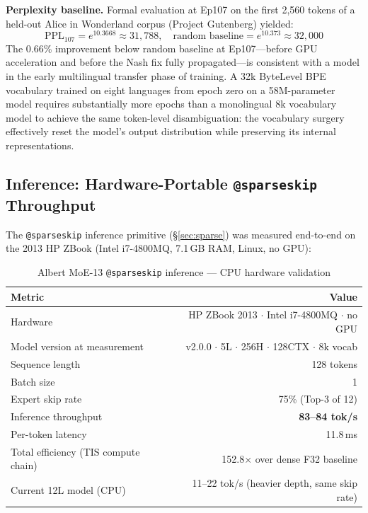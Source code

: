 \documentclass[11pt,a4paper]{article}
\begin{document}
\textbf{Perplexity baseline.}
Formal evaluation at Ep107 on the first 2,560 tokens of a held-out Alice in
Wonderland corpus (Project Gutenberg) yielded:
\begin{equation}
  \text{PPL}_{107} = e^{10.3668} \approx 31{,}788,
  \quad \text{random baseline} = e^{10.373} \approx 32{,}000
\end{equation}
The 0.66\% improvement below random baseline at Ep107---before GPU acceleration
and before the Nash fix fully propagated---is consistent with a model in the early
multilingual transfer phase of training. A 32k ByteLevel BPE vocabulary trained on
eight languages from epoch zero on a 58M-parameter model requires substantially
more epochs than a monolingual 8k vocabulary model to achieve the same
token-level disambiguation: the vocabulary surgery effectively reset the model's
output distribution while preserving its internal representations.

\subsection{Inference: Hardware-Portable \texttt{@sparseskip} Throughput}
\label{subsec:inference_throughput}

The \texttt{@sparseskip} inference primitive (\S\ref{sec:sparse}) was measured
end-to-end on the 2013 HP ZBook (Intel i7-4800MQ, 7.1\,GB RAM, Linux, no GPU):

\begin{table}[htbp]
\centering
\small
\caption{Albert MoE-13 \texttt{@sparseskip} inference --- CPU hardware validation}
\label{tab:inference}
\begin{tabular}{lr}
\toprule
Metric & Value \\
\midrule
Hardware & HP ZBook 2013 $\cdot$ Intel i7-4800MQ $\cdot$ no GPU \\
Model version at measurement & v2.0.0 $\cdot$ 5L $\cdot$ 256H $\cdot$ 128CTX $\cdot$ 8k vocab \\
Sequence length & 128 tokens \\
Batch size & 1 \\
Expert skip rate & 75\% (Top-3 of 12) \\
Inference throughput & \textbf{83--84 tok/s} \\
Per-token latency & 11.8\,ms \\
Total efficiency (TIS compute chain) & 152.8$\times$ over dense F32 baseline \\
Current 12L model (CPU) & 11--22 tok/s (heavier depth, same skip rate) \\
\bottomrule
\end{tabular}
\end{table}
\end{document}

